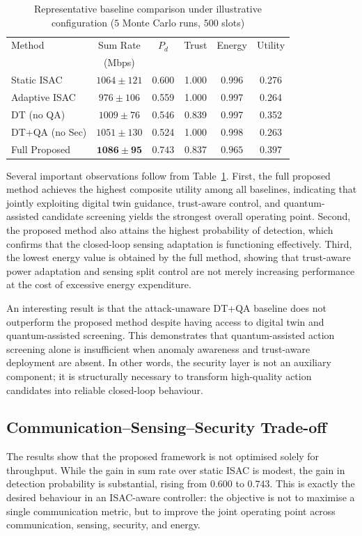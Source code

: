 \documentclass[10pt,journal]{IEEEtran}
\begin{document}
\begin{table}[t]
\centering
\caption{Representative baseline comparison under illustrative configuration (\(5\) Monte Carlo runs, \(500\) slots)}
\label{tab:baseline}
\begin{tabular}{lccccc}
\toprule
Method & Sum Rate & \(P_d\) & Trust & Energy & Utility \\
 & (Mbps) &  &  &  &  \\
\midrule
Static ISAC & \(1064\pm121\) & 0.600 & 1.000 & 0.996 & 0.276 \\
Adaptive ISAC & \(976\pm106\) & 0.559 & 1.000 & 0.997 & 0.264 \\
DT (no QA) & \(1009\pm76\) & 0.546 & 0.839 & 0.997 & 0.352 \\
DT+QA (no Sec) & \(1051\pm130\) & 0.524 & 1.000 & 0.998 & 0.263 \\
Full Proposed & \(\mathbf{1086\pm95}\) & \(\mathbf{0.743}\) & 0.837 & \(\mathbf{0.965}\) & \(\mathbf{0.397}\) \\
\bottomrule
\end{tabular}
\end{table}

Several important observations follow from Table~\ref{tab:baseline}. First, the full proposed method achieves the highest composite utility among all baselines, indicating that jointly exploiting digital twin guidance, trust-aware control, and quantum-assisted candidate screening yields the strongest overall operating point. Second, the proposed method also attains the highest probability of detection, which confirms that the closed-loop sensing adaptation is functioning effectively. Third, the lowest energy value is obtained by the full method, showing that trust-aware power adaptation and sensing split control are not merely increasing performance at the cost of excessive energy expenditure.

An interesting result is that the attack-unaware DT+QA baseline does not outperform the proposed method despite having access to digital twin and quantum-assisted screening. This demonstrates that quantum-assisted action screening alone is insufficient when anomaly awareness and trust-aware deployment are absent. In other words, the security layer is not an auxiliary component; it is structurally necessary to transform high-quality action candidates into reliable closed-loop behaviour.

\subsection{Communication--Sensing--Security Trade-off}
The results show that the proposed framework is not optimised solely for throughput. While the gain in sum rate over static ISAC is modest, the gain in detection probability is substantial, rising from \(0.600\) to \(0.743\). This is exactly the desired behaviour in an ISAC-aware controller: the objective is not to maximise a single communication metric, but to improve the joint operating point across communication, sensing, security, and energy.
\end{document}
